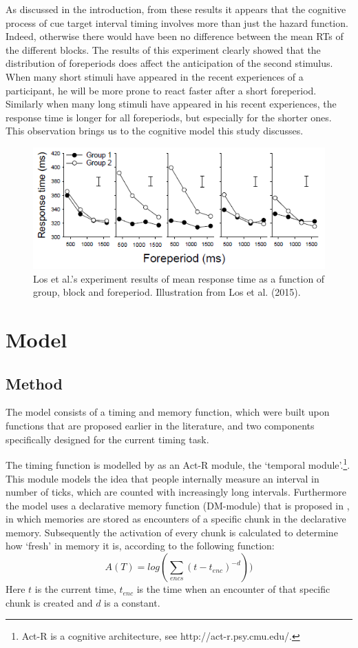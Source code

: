 \documentclass[10pt,letterpaper]{article}
\begin{document}
As discussed in the introduction, from these results it appears that the cognitive process of cue target interval timing involves more than just the hazard function. Indeed, otherwise there would have been no difference between the mean RTs of the different blocks. The results of this experiment clearly showed that the distribution of foreperiods does affect the anticipation of the second stimulus. When many short stimuli have appeared in the recent experiences of a participant, he will be more prone to react faster after a short foreperiod. Similarly when many long stimuli have appeared in his recent experiences, the response time is longer for all foreperiods, but especially for the shorter ones. This observation brings us to the cognitive model this study discusses.

\begin{figure}
	\centering
	\includegraphics[width=\columnwidth]{Los1.png}
	\caption{Los et al.'s experiment results of mean response time as a function of group, block and foreperiod. Illustration from Los et al. (2015).}
	\label{LosFigure}
\end{figure}

\section{Model}
\subsection{Method}
The model consists of a timing and memory function, which were built upon functions that are proposed earlier in the literature, and two components specifically designed for the current timing task. 

The timing function is modelled by \citet{Taatgen1} as an Act-R module, the `temporal module'.\footnote{Act-R is a cognitive architecture, see http://act-r.psy.cmu.edu/.}. This module models the idea that people internally measure an interval in number of ticks, which are counted with increasingly long intervals. Furthermore the model uses a declarative memory function (DM-module) that is proposed in \citet{Taatgen}, in which memories are stored as encounters of a specific chunk in the declarative memory. Subsequently the activation of every chunk is calculated to determine how `fresh' in memory it is, according to the following function:
\begin{equation}
	A(T) = log(\sum_{encs}(t - t_{enc})^{-d}))
\end{equation}
Here $t$ is the current time, $t_{enc}$ is the time when an encounter of that specific chunk is created and $d$ is a constant.
\end{document}
